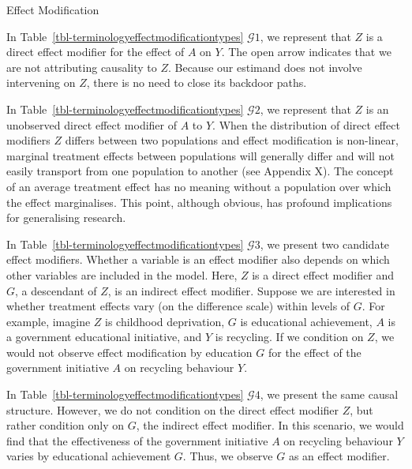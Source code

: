\documentclass[
  single column]{article}
\begin{document}
\begin{table}

\caption{\label{tbl-terminologyeffectmodificationtypes}Effect
Modification}

\centering{

\terminologyeffectmodificationtypes

}

\end{table}%

In Table~\ref{tbl-terminologyeffectmodificationtypes} \(\mathcal{G}1\),
we represent that \(Z\) is a direct effect modifier for the effect of
\(A\) on \(Y\). The open arrow indicates that we are not attributing
causality to \(Z\). Because our estimand does not involve intervening on
\(Z\), there is no need to close its backdoor paths.

In Table~\ref{tbl-terminologyeffectmodificationtypes} \(\mathcal{G}2\),
we represent that \(Z\) is an unobserved direct effect modifier of \(A\)
to \(Y\). When the distribution of direct effect modifiers \(Z\) differs
between two populations and effect modification is non-linear, marginal
treatment effects between populations will generally differ and will not
easily transport from one population to another (see Appendix X). The
concept of an average treatment effect has no meaning without a
population over which the effect marginalises. This point, although
obvious, has profound implications for generalising research.

In Table~\ref{tbl-terminologyeffectmodificationtypes} \(\mathcal{G}3\),
we present two candidate effect modifiers. Whether a variable is an
effect modifier also depends on which other variables are included in
the model. Here, \(Z\) is a direct effect modifier and \(G\), a
descendant of \(Z\), is an indirect effect modifier. Suppose we are
interested in whether treatment effects vary (on the difference scale)
within levels of \(G\). For example, imagine \(Z\) is childhood
deprivation, \(G\) is educational achievement, \(A\) is a government
educational initiative, and \(Y\) is recycling. If we condition on
\(Z\), we would not observe effect modification by education \(G\) for
the effect of the government initiative \(A\) on recycling behaviour
\(Y\).

In Table~\ref{tbl-terminologyeffectmodificationtypes} \(\mathcal{G}4\),
we present the same causal structure. However, we do not condition on
the direct effect modifier \(Z\), but rather condition only on \(G\),
the indirect effect modifier. In this scenario, we would find that the
effectiveness of the government initiative \(A\) on recycling behaviour
\(Y\) varies by educational achievement \(G\). Thus, we observe \(G\) as
an effect modifier.
\end{document}
